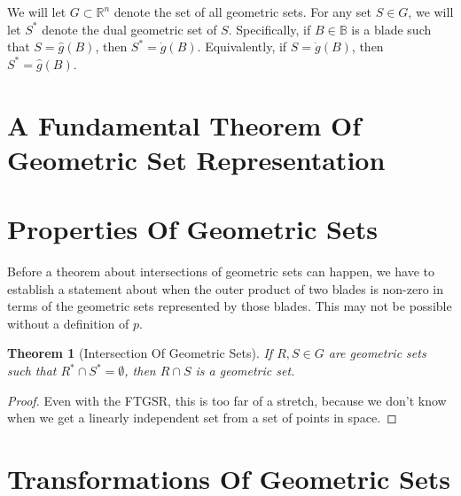 \documentclass{birkjour}
\newtheorem{thm}{Theorem}[section]
\theoremstyle{definition}
\theoremstyle{remark}
\numberwithin{equation}{section}
\newcommand{\R}{\mathbb{R}}
\newcommand{\B}{\mathbb{B}}
\newcommand{\gd}{\dot{g}}
\newcommand{\gh}{\hat{g}}
\begin{document}
We will let $G\subset\R^n$ denote the set of all geometric sets.  For any set $S\in G$, we will let $S^*$ denote the dual geometric
set of $S$.  Specifically, if $B\in\B$ is a blade such that $S=\gh(B)$, then $S^*=\gd(B)$.  Equivalently, if $S=\gd(B)$, then $S^*=\gh(B)$.

\section{A Fundamental Theorem Of Geometric Set Representation}


\section{Properties Of Geometric Sets}

Before a theorem about intersections of geometric sets can happen, we have to establish a statement
about when the outer product of two blades is non-zero in terms of the geometric sets represented by
those blades.  This may not be possible without a definition of $p$.

\begin{thm}[Intersection Of Geometric Sets]
If $R,S\in G$ are geometric sets such that $R^*\cap S^*=\emptyset$,
then $R\cap S$ is a geometric set.
\end{thm}
\begin{proof}
Even with the FTGSR, this is too far of a stretch, because we don't know when we get a linearly
independent set from a set of points in space.
\end{proof}



\section{Transformations Of Geometric Sets}

\end{document}
